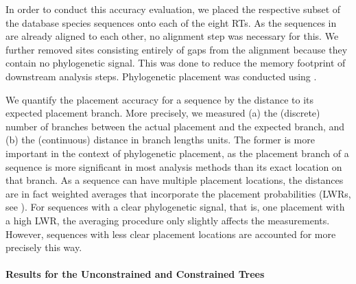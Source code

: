In order to conduct this accuracy evaluation,
we placed the respective subset of the  database species sequences onto each of the eight \acp{RT}.
As the sequences in  are already aligned to each other, no alignment step was necessary for this.
We further removed sites consisting entirely of gaps from the alignment because they contain no phylogenetic signal.
This was done to reduce the memory footprint of downstream analysis steps.
Phylogenetic placement was conducted using  \cite{Barbera2018}.

We quantify the placement accuracy for a sequence by the distance to its expected placement branch.
More precisely, we measured (a) the (discrete) number of branches between the actual placement and the expected branch,
and (b) the (continuous) distance in branch lengths units.
The former is more important in the context of phylogenetic placement,
as the placement branch of a sequence is more significant in most analysis methods than its exact location on that branch.
As a sequence can have multiple placement locations,
the distances are in fact weighted averages that incorporate the placement probabilities
(LWRs, see ).
For sequences with a clear phylogenetic signal, that is, one placement with a high \ac{LWR},
the averaging procedure only slightly affects the measurements.
However, sequences with less clear placement locations are accounted for more precisely this way.


\paragraph{Results for the Unconstrained and Constrained Trees}
\label{ch:AutomaticTrees:sec:Evaluation:sub:Accuracy:par:UnconstrainedConstrainedResults}

